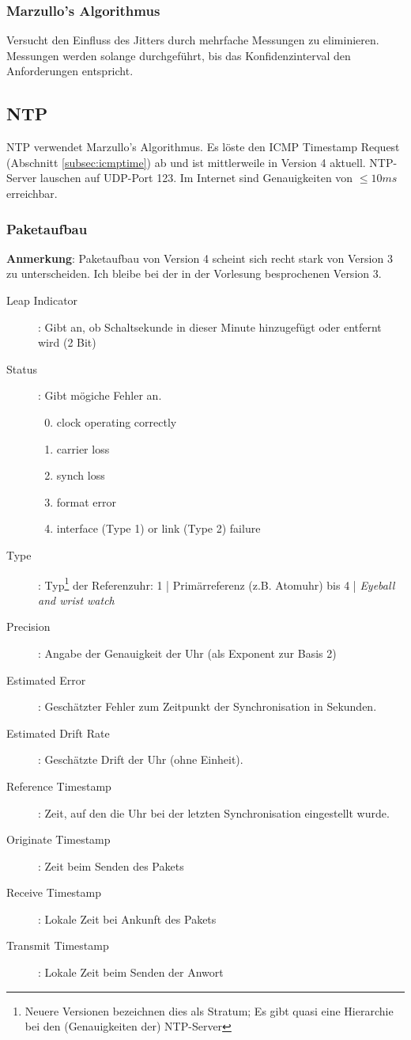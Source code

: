 \documentclass{article} %
\begin{document}
\subsubsection{Marzullo's Algorithmus}
Versucht den Einfluss des Jitters durch mehrfache Messungen zu eliminieren.
Messungen werden solange durchgeführt, bis das Konfidenzinterval den Anforderungen entspricht.

\subsection{NTP}
NTP\cite{rfc1305, rfc5905} verwendet Marzullo's Algorithmus.
Es löste den ICMP Timestamp Request (Abschnitt \ref{subsec:icmptime}) ab und ist mittlerweile in Version 4 aktuell.
NTP-Server lauschen auf UDP-Port 123.
Im Internet sind Genauigkeiten von $\leq 10ms$ erreichbar.

\subsubsection{Paketaufbau}
\textbf{Anmerkung}: Paketaufbau von Version 4 scheint sich recht stark von Version 3 zu unterscheiden.
Ich bleibe bei der in der Vorlesung besprochenen Version 3.
\begin{description}
	\item[Leap Indicator]: Gibt an, ob Schaltsekunde in dieser Minute hinzugefügt oder entfernt wird  (2 Bit)
	\item[Status]: Gibt mögiche Fehler an.
		\begin{enumerate}
			\setcounter{enumi}{-1}
			\item clock operating correctly
			\item carrier loss
			\item synch loss
			\item format error
			\item interface (Type 1) or link (Type 2) failure
		\end{enumerate}
	\item[Type]: Typ\footnote{Neuere Versionen bezeichnen dies als Stratum; Es gibt quasi eine Hierarchie bei den (Genauigkeiten der) NTP-Server} der Referenzuhr: 1 | Primärreferenz (z.B. Atomuhr) bis 4 | \emph{Eyeball and wrist watch}
	\item[Precision]: Angabe der Genauigkeit der Uhr (als Exponent zur Basis 2)
	\item[Estimated Error]: Geschätzter Fehler zum Zeitpunkt der Synchronisation in Sekunden.
	\item[Estimated Drift Rate]: Geschätzte Drift der Uhr (ohne Einheit).
	\item[Reference Timestamp]: Zeit, auf den die Uhr bei der letzten Synchronisation eingestellt
	wurde.
	\item[Originate Timestamp]: Zeit beim Senden des Pakets
	\item[Receive Timestamp]: Lokale Zeit bei Ankunft des Pakets
	\item[Transmit Timestamp]: Lokale Zeit beim Senden der Anwort
\end{description}
\end{document}
